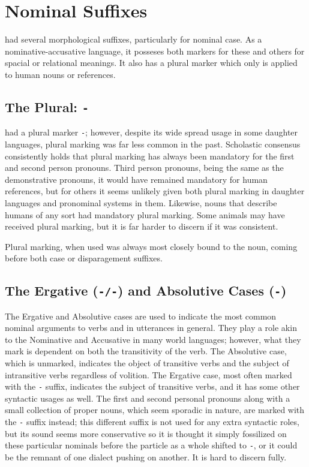 \section{Nominal Suffixes}
\langname had several morphological suffixes, particularly for nominal case. As a nominative-accusative language, it posseses both markers for these and others for spacial or relational meanings. It also has a plural marker which only is applied to human nouns or references.

\subsection{The Plural: \texttt{-\plural}}
\langname had a plural marker \texttt{-\plural}; however, despite its wide spread usage in some daughter languages, plural marking was far less common in the past. Scholastic consensus consistently holds that plural marking has always been mandatory for the first and second person pronouns. Third person pronouns, being the same as the demonstrative pronouns, it would have remained mandatory for human references, but for others it seems unlikely given both plural marking in daughter languages and pronominal systems in them. Likewise, nouns that describe humans of any sort had mandatory plural marking. Some animals may have received plural marking, but it is far harder to discern if it was consistent.\par
Plural marking, when used was always most closely bound to the noun, coming before both case or disparagement suffixes.\par

\subsection{The Ergative (\texttt{-\erg/-\ergold}) and Absolutive Cases (\texttt{-\varnothing})}
The Ergative and Absolutive cases are used to indicate the most common nominal arguments to verbs and in utterances in general. They play a role akin to the Nominative and Accusative in many world languages; however, what they mark is dependent on both the transitivity of the verb. The Absolutive case, which is unmarked, indicates the object of transitive verbs and the subject of intransitive verbs regardless of volition. The Ergative case, most often marked with the \texttt{-\erg} suffix, indicates the subject of transitive verbs, and it has some other syntactic usages as well. The first and second personal pronouns along with a small collection of proper nouns, which seem sporadic in nature, are marked with the \texttt{-\ergold} suffix instead; this different suffix is not used for any extra syntactic roles, but its sound seems more conservative so it is thought it simply fossilized on these particular nominals before the particle as a whole shifted to \texttt{-\erg}, or it could be the remnant of one dialect pushing on another. It is hard to discern fully.
